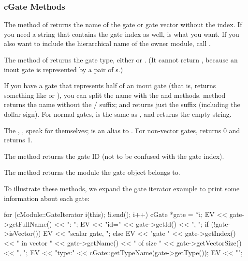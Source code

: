 \subsubsection{cGate Methods}
\label{sec:simple-modules:cgate-methods}

The  method of  returns the name of the
gate or gate vector without the index. If you need a string that contains the gate index
as well,  is what you want. If you also want to
include the hierarchical name of the owner module, call .

The  method of  returns the gate type,
either  or . (It cannot return
, because an inout gate is represented by a pair
of s.)

If you have a gate that represents half of an inout gate (that is,
 returns something like  or ), you
can split the name with the  and
 methods.  method returns the
name without the / suffix; and 
returns just the suffix (including the dollar sign). For normal gates,
 is the same as , and
 returns the empty string.

The , ,  speak
for themselves;  is an alias to . For
non-vector gates,  returns 0 and 
returns 1.

The  method returns the gate ID (not to be confused
with the gate index).

The  method returns the module the gate object
belongs to.

To illustrate these methods, we expand the gate iterator example
to print some information about each gate:

\begin{cpp}
for (cModule::GateIterator i(this); !i.end(); i++) {
    cGate *gate = *i;
    EV << gate->getFullName() << ": ";
    EV << "id=" << gate->getId() << ", ";
    if (!gate->isVector())
        EV << "scalar gate, ";
    else
        EV << "gate " << gate->getIndex()
           << " in vector " << gate->getName()
           << " of size " << gate->getVectorSize() << ", ";
    EV << "type:" << cGate::getTypeName(gate->getType());
    EV << "\n";
}
\end{cpp}

